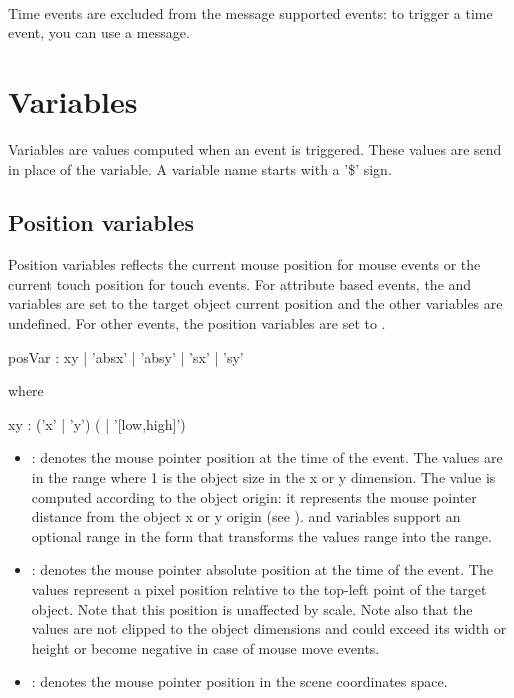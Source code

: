 \documentclass[a4paper,twoside]{report}
\newcommand{\sublevel}[1]	{\section{#1}}
\newcommand{\subsublevel}[1]	{\subsection{#1}}
\begin{document}
\note \\
Time events are excluded from the  message supported events: to trigger a time event, you can use a  message.



\sublevel{Variables}
\label{interactvar}

Variables are values computed when an event is triggered. These values are send in place of the variable. A variable name starts with a '\$' sign. 

\subsublevel{Position variables}
\label{posvar}

Position variables reflects the current mouse position for mouse events or the current touch position for touch events. 
For attribute based events, the  and   variables are set to the target object current position and the other variables are undefined. For other events, the position variables are set to . 


\begin{rail} 
posVar : xy | 'absx' | 'absy' | 'sx' | 'sy' 
\end{rail}

where
\begin{rail} 
xy : ('x' | 'y') ( | '[low,high]') 
\end{rail}

\begin{itemize}
\item {} : denotes the mouse pointer position at the time of the event. The values are in the range  where 1 is the object size in the x or y dimension. The value is computed according to the object origin: it represents the mouse pointer distance from the object x or y origin (see ).  and  variables support an optional range in the form  that transforms the   values range into the  range.

\item {} : denotes the mouse pointer absolute position at the time of the event. The values represent a pixel position relative to the top-left point of the target object. Note that this position is unaffected by scale. 
Note also that the values are not clipped to the object dimensions and could exceed its width or height or become negative in case of mouse move events.

\item {} : denotes the mouse pointer position in the scene coordinates space. 
\end{itemize}
\end{document}
